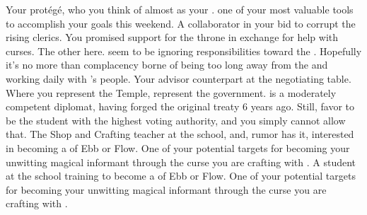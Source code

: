 \documentclass[char]{GL2020}
\begin{document}
\begin{contacts}
	\contact{\cScholarship{}} Your protégé, who you think of almost as your \cScholarship{\child}. \cScholarship{\They} \cScholarship{\are} one of your most valuable tools to accomplish your goals this weekend.
            \contact{\cPrince{}} A collaborator in your bid to corrupt the rising \pShip{} clerics. You promised support for the throne in exchange for \cPrince{\their} help with curses.
	\contact{\cBeetle{}} The other \pTech{} \cBeetle{\cleric} here. \cBeetle{\They} seem\cBeetle{\plural} to be ignoring \cBeetle{\their} responsibilities toward the \pTech{}. Hopefully it's no more than complacency borne of being too long away from the \pTech{} and working daily with \cTechGod{}'s people.
	\contact{\cDiplomat{}} Your advisor counterpart at the negotiating table. Where you represent the Temple, \cDiplomat{\they} represent\cDiplomat{\plural} the government. \cDiplomat{} is a moderately competent diplomat, having forged the original treaty 6 years ago. Still, \cDiplomat{\they} favor \cHeir{} to be the student with the highest voting authority, and you simply cannot allow that.
	\contact{\cPirate{}} The Shop and Crafting teacher at the school, and, rumor has it, interested in becoming a \cPirate{\cleric} of Ebb or Flow. One of your potential targets for becoming your unwitting magical informant through the curse you are crafting with \cPrince{}.
	\contact{\cInitiate{}} A student at the school training to become a \cInitiate{\cleric} of Ebb or Flow. One of your potential targets for becoming your unwitting magical informant through the curse you are crafting with \cPrince{}.
\end{contacts}
\end{document}
